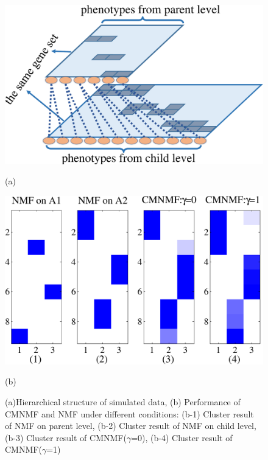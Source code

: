 \documentclass{bmcart}
\begin{document}
\begin{figure}
  \centering
  \begin{minipage}{.4\linewidth}
  \centering
    \includegraphics[width=\linewidth]{fig/simulate_data.pdf}
    \centerline{(a)}
  \end{minipage}
  \begin{minipage}{.4\linewidth}
   \includegraphics[width=\linewidth]{fig/simulate_result.pdf}
    \centerline{(b)}
  \end{minipage}
  \caption{(a)Hierarchical structure of simulated data, (b) Performance of CMNMF and NMF under different conditions: (b-1) Cluster result of NMF on parent level, (b-2) Cluster result of NMF on child level, (b-3) Cluster result of CMNMF($\gamma$=0), (b-4) Cluster result of CMNMF($\gamma$=1)}
  \label{fig:simulate_data}
\end{figure}
\end{document}
